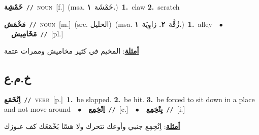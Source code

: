 \documentclass[10pt,a4paper,twoside]{article} %
\begin{document}
\begin{multicols}{2}
{\setlength\topsep{0pt}\textbf{\foreignlanguage{arabic}{خَمْشِة}}\ {\color{gray}\texttt{//}\color{black}}\ \textsc{noun}\ [f.]\ \color{gray}(msa. \foreignlanguage{arabic}{خَمْشَة}~\foreignlanguage{arabic}{\textbf{١.}})\color{black}\ \textbf{1.}~claw  \textbf{2.}~scratch\ } \vspace{2mm}

{\setlength\topsep{0pt}\textbf{\foreignlanguage{arabic}{مَخْمَش}}\ {\color{gray}\texttt{//}\color{black}}\ \textsc{noun}\ [m.]\ (src. \color{gray}\foreignlanguage{arabic}{الخليل}\color{black})\ \color{gray}(msa. \foreignlanguage{arabic}{زُقَّة}~\foreignlanguage{arabic}{\textbf{٢.}}  \foreignlanguage{arabic}{زاوِيَة}~\foreignlanguage{arabic}{\textbf{١.}})\color{black}\ \textbf{1.}~alley\ \ $\bullet$\ \ \setlength\topsep{0pt}\textbf{\foreignlanguage{arabic}{مَخَامِيش}}\ {\color{gray}\texttt{//}\color{black}}\ [pl.]\  \begin{flushright}\color{gray}\foreignlanguage{arabic}{\textbf{\underline{\foreignlanguage{arabic}{أمثلة}}}: المخيم في كثير مخاميش وممرات عتمة}\end{flushright}\color{black}} \vspace{2mm}

\vspace{-3mm}
\subsection*{\color{blue}\foreignlanguage{arabic}{خ.م.ع}\color{blue}{}} 

{\setlength\topsep{0pt}\textbf{\foreignlanguage{arabic}{اِنْخَمَع}}\ {\color{gray}\texttt{//}\color{black}}\ \textsc{verb}\ [p.]\ \textbf{1.}~be slapped.  \textbf{2.}~be hit.  \textbf{3.}~be forced to sit down in a place and not move around\ \ $\bullet$\ \ \setlength\topsep{0pt}\textbf{\foreignlanguage{arabic}{اِنْخِمِع}}\ {\color{gray}\texttt{//}\color{black}}\ [c.]\ \ $\bullet$\ \ \setlength\topsep{0pt}\textbf{\foreignlanguage{arabic}{يِنْخِمِع}}\ {\color{gray}\texttt{//}\color{black}}\ [i.]\  \begin{flushright}\color{gray}\foreignlanguage{arabic}{\textbf{\underline{\foreignlanguage{arabic}{أمثلة}}}: اِنْخِمِع جنبي وأوعك تتحرك ولا هسّا بَخْمَعَك كف عبوزك}\end{flushright}\color{black}} \vspace{2mm}


\end{multicols}
\end{document}
